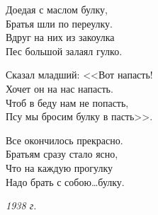 Доедая с маслом булку,\\
Братья шли по переулку.\\
Вдруг на них из закоулка\\
Пес большой залаял гулко.

Сказал младший: <<Вот напасть!\\
Хочет он на нас напасть.\\
Чтоб в беду нам не попасть,\\
Псу мы бросим булку в пасть>>.

Все окончилось прекрасно.\\
Братьям сразу стало ясно,\\
Что на каждую прогулку\\
Надо брать с собою\dots булку.

\medskip
\noindent\textit{1938 г.}